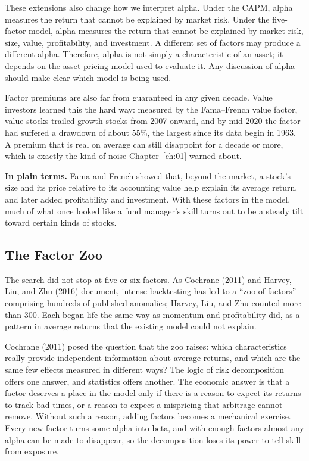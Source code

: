 These extensions also change how we interpret alpha. Under the CAPM, alpha measures the return that cannot be explained by market risk.
Under the five-factor model, alpha measures the return that cannot be explained by market risk, size, value, profitability, and investment.
A different set of factors may produce a different alpha. Therefore, alpha is not simply a characteristic of an asset; it depends on the
asset pricing model used to evaluate it. Any discussion of alpha should make clear which model is being used.

Factor premiums are also far from guaranteed in any given decade. Value investors learned this the hard way: measured by the Fama--French value factor, value stocks trailed growth stocks from 2007 onward, and by mid-2020 the factor had suffered a drawdown of about 55\%, the largest since its data begin in 1963. A premium that is real on average can still disappoint for a decade or more, which is exactly the kind of noise Chapter~\ref{ch:01} warned about.

\noindent\textbf{In plain terms.} Fama and French showed that, beyond the market, a stock's size and its price relative to its accounting value help explain its average return, and later added profitability and investment. With these factors in the model, much of what once looked like a fund manager's skill turns out to be a steady tilt toward certain kinds of stocks.

\subsection{The Factor Zoo}
\label{sec:04-zoo}
The search did not stop at five or six factors. As Cochrane (2011) and Harvey, Liu, and Zhu (2016) document, intense backtesting has led to a ``zoo of factors'' comprising hundreds of published anomalies; Harvey, Liu, and Zhu counted more than 300. Each began life the same way as momentum and profitability did, as a pattern in average returns that the existing model could not explain.

Cochrane (2011) posed the question that the zoo raises: which characteristics really provide independent information about average returns, and which are the same few effects measured in different ways? The logic of risk decomposition offers one answer, and statistics offers another. The economic answer is that a factor deserves a place in the model only if there is a reason to expect its returns to track bad times, or a reason to expect a mispricing that arbitrage cannot remove. Without such a reason, adding factors becomes a mechanical exercise. Every new factor turns some alpha into beta, and with enough factors almost any alpha can be made to disappear, so the decomposition loses its power to tell skill from exposure.


